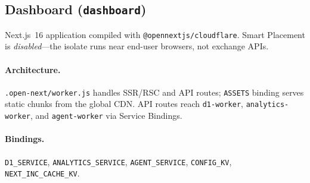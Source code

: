 \subsection{Dashboard (\texttt{dashboard})}

Next.js~16 application compiled with \texttt{@opennextjs/cloudflare}. Smart Placement is \emph{disabled}---the isolate runs near end-user browsers, not exchange APIs.

\paragraph{Architecture.} \texttt{.open-next/worker.js} handles SSR/RSC and API routes; \texttt{ASSETS} binding serves static chunks from the global CDN. API routes reach \texttt{d1-worker}, \texttt{analytics-worker}, and \texttt{agent-worker} via Service Bindings.

\paragraph{Bindings.} \texttt{D1\_SERVICE}, \texttt{ANALYTICS\_SERVICE}, \texttt{AGENT\_SERVICE}, \texttt{CONFIG\_KV}, \texttt{NEXT\_INC\_CACHE\_KV}.